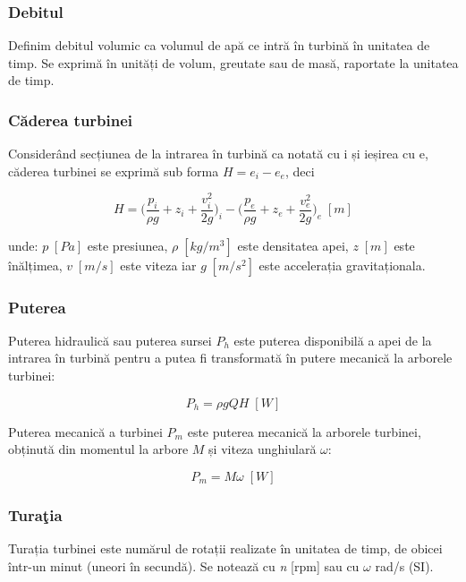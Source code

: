 \subsubsection{Debitul}

Definim debitul volumic ca volumul de apă ce intră în turbină în unitatea de timp. Se exprimă în unități de volum, greutate sau de masă, raportate la unitatea de timp.


\subsubsection{Căderea turbinei}

Considerând secțiunea de la intrarea în turbină ca notată cu i și ieșirea cu e, căderea turbinei se exprimă sub forma $H=e_i-e_e$, deci

\begin{equation}
H=\bigg(\frac{p_i}{{\rho}g}+z_i+\frac{v_i^2}{2g}\bigg)_i-\bigg(\frac{p_e}{{\rho}g}+z_e+\frac{v_e^2}{2g}\bigg)_e \;[\si{m}]
\end{equation}

unde: $p\;[\si{Pa}]$ este presiunea, ${\rho}\;[\si{kg/m^3}]$ este densitatea apei, $z\;[\si{m}]$ este înălțimea, $v\;[\si{m/s}]$ este viteza iar $g\;[\si{m/s^2}]$ este accelerația gravitaționala.

\subsubsection{Puterea}

Puterea hidraulică sau puterea sursei $P_h$ este puterea disponibilă a apei de la intrarea în turbină pentru a putea fi transformată în putere mecanică la arborele turbinei:

\begin{equation}
P_h={\rho}gQH\; [\si{W}]
\end{equation}

Puterea mecanică a turbinei $P_m$ este puterea mecanică la arborele turbinei, obținută din momentul la arbore $M$ și viteza unghiulară $\omega$:

\begin{equation}
P_m=M{\omega}\; [\si{W}]
\end{equation}

\subsubsection{Tura\c{t}ia}

Turația turbinei este numărul de rotații realizate în unitatea de timp, de obicei într-un minut (uneori în secundă). Se notează cu \textit{n} [rpm] sau cu \(\omega\) rad/s (SI).

